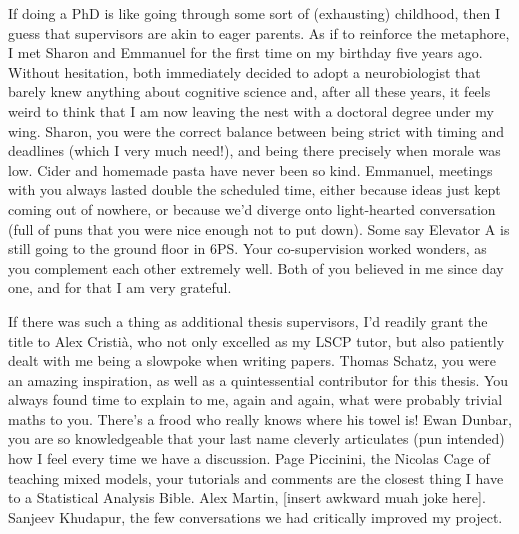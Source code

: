 \documentclass[12pt, twoside]{report}
\begin{document}
If doing a PhD is like going through some sort of (exhausting) childhood, then I guess that supervisors are akin to eager parents. As if to reinforce the metaphore, I met Sharon and Emmanuel for the first time on my birthday five years ago. Without hesitation, both immediately decided to adopt a neurobiologist that barely knew anything about cognitive science and, after all these years, it feels weird to think that I am now leaving the nest with a doctoral degree under my wing. Sharon, you were the correct balance between being strict with timing and deadlines (which I very much need!), and being there precisely when morale was low. Cider and homemade pasta have never been so kind. Emmanuel, meetings with you always lasted double the scheduled time, either because ideas just kept coming out of nowhere, or because we'd diverge onto light-hearted conversation (full of puns that you were nice enough not to put down). Some say Elevator A is still going to the ground floor in 6PS. Your co-supervision worked wonders, as you complement each other extremely well. Both of you believed in me since day one, and for that I am very grateful.          

If there was such a thing as additional thesis supervisors, I'd readily grant the title to Alex Cristià, who not only excelled as my LSCP tutor, but also patiently dealt with me being a slowpoke when writing papers.
Thomas Schatz, you were an amazing inspiration, as well as a quintessential contributor for this thesis. You always found time to explain to me, again and again, what were probably trivial maths to you. There's a frood who really knows where his towel is! Ewan Dunbar, you are so knowledgeable that your last name cleverly articulates (pun intended) how I feel every time we have a discussion. 
Page Piccinini, the Nicolas Cage of teaching mixed models, your tutorials and comments are the closest thing I have to a Statistical Analysis Bible.
Alex Martin, [insert awkward muah joke here].
Sanjeev Khudapur, the few conversations we had critically improved my project.\\
\end{document}
